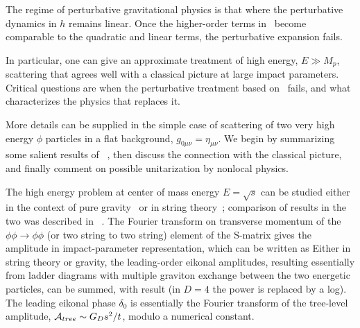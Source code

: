 The regime of perturbative gravitational physics is that where the perturbative dynamics in $h$ remains linear.  Once the higher-order terms in \gravpert\ become comparable to the quadratic and linear terms, the perturbative expansion fails.

In particular, one can give an approximate treatment of high energy, $E\gg M_p$, scattering that agrees well with a classical picture at large impact parameters.  Critical questions are when the perturbative treatment based on \gravpert\ fails, and what characterizes the physics that replaces it.



More details can be supplied in the simple case of scattering of two very high energy $\phi$ particles in a flat background, $g_{0\mu\nu}=\eta_{\mu\nu}$.  We begin by summarizing some salient results of 
~, 
then discuss the connection with the classical picture, and finally comment on possible unitarization by nonlocal physics.  

The high energy problem  at center of mass energy $E=\sqrt s$ can be studied either in the context of pure gravity~ or in string theory~; comparison of results in the two was described in ~.   The Fourier transform on transverse momentum of the $\phi\phi\rightarrow\phi\phi$ (or two string to two string) element of the S-matrix  gives the amplitude in impact-parameter representation, which can be written as
%
\eqn{}
%
Either in string theory or gravity, the leading-order eikonal amplitudes, resulting essentially from ladder diagrams with multiple graviton exchange between the two energetic particles, can be summed, with result
%
\eqn{}
%
(in $D=4$ the power is replaced by a log).  The leading eikonal phase $\delta_0$ is essentially the Fourier transform of the tree-level amplitude, ${\cal A}_{tree}\sim G_Ds^2/t$,
%
\eqn{}
%
modulo a numerical constant.

